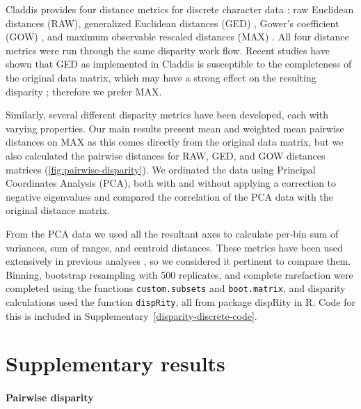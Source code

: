 \documentclass[british,a4paper]{article}
\newcommand\pcref[1]{(\cref{#1})}
\begin{document}
\indent Claddis provides four distance metrics for discrete character data
\autocite{Lloyd2016BJLS}: raw Euclidean distances (RAW), generalized Euclidean
distances (GED) \autocite{Wills1994P}, Gower's coefficient (GOW)
\autocite{Gower1971B}, and maximum observable rescaled distances (MAX)
\autocite{Lloyd2016BJLS}. All four distance metrics were run through the same
disparity work flow. Recent studies have shown that GED as implemented in
Claddis is susceptible to the completeness of the original data matrix, which
may have a strong effect on the resulting disparity
\autocite{FlannerySutherland2019PRSBBS, Lehmann2019P}; therefore we prefer MAX\@.

Similarly, several different disparity metrics have been developed, each with
varying properties. Our main results present mean and weighted mean pairwise
distances on MAX as this comes directly from the original data matrix, but we
also calculated the pairwise distances for RAW, GED, and GOW distances matrices
\pcref{fig:pairwise-disparity}. We ordinated the data using Principal
Coordinates Analysis (PCA), both with and without applying a correction to
negative eigenvalues \autocite{Caillez1983P} and compared the correlation of the
PCA data with the original distance matrix. 

From the PCA data we used all the resultant axes to calculate per-bin sum of
variances, sum of ranges, and centroid distances. These metrics have been used
extensively in previous analyses \autocite{Wills1998BJLS, Thorne2011PNAS,
FlannerySutherland2019PRSBBS}, so we considered it pertinent to compare them.
Binning, bootstrap resampling with 500 replicates, and complete rarefaction
were completed using the functions \texttt{custom.subsets} and
\texttt{boot.matrix}, and disparity calculations used the function
\texttt{dispRity}, all from package dispRity \autocite{Guillerme2018MEE} in R.
Code for this is included in Supplementary~\cref{disparity-discrete-code}.


\section{Supplementary results}\label{sec:supplemental-results}

\paragraph{Pairwise disparity}\label{par:pairwise-disparity}
\end{document}
